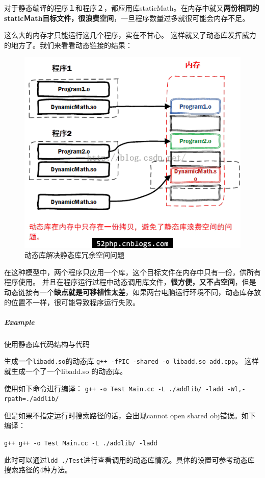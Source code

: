 \documentclass[UTF8,a4paper,12pt]{ctexbook}
\begin{document}
			对于静态编译的程序１和程序２，都应用库staticMath。在内存中就又\textbf{两份相同的staticＭath目标文件，很浪费空间}，一旦程序数量过多就很可能会内存不足。
			
			这么大的内存才只能运行这几个程序，实在不甘心。
			这样就又了动态库发挥威力的地方了。我们来看看动态链接的结果：
			
			\begin{figure}[h]
				\centering
				\includegraphics[scale = 0.7]{dynamicLib.png}
				\caption{动态库解决静态库冗余空间问题}
			\end{figure}

			在这种模型中，两个程序只应用一个库，这个目标文件在内存中只有一份，供所有程序使用。
			并且在程序运行过程中动态调用库文件，\textbf{很方便，又不占空间}，但是动态链接有一个\textbf{缺点就是可移植性太差}，如果两台电脑运行环境不同，动态库存放的位置不一样，很可能导致程序运行失败。
			
			\subparagraph{Example}使用静态库代码结构与代码
			
			生成一个\verb|libadd.so|的动态库
			\verb|g++ -fPIC -shared -o libadd.so add.cpp|。
			这样就生成一个了一个libadd.so 的动态库。
			
			
			使用如下命令进行编译：
			\verb|g++ -o Test Main.cc -L ./addlib/ -ladd -Wl,-rpath=./addlib/|
			
			但是如果不指定运行时搜索路径的话，会出现cannot open shared obj错误。如下编译：
			
			\verb|g++ g++ -o Test Main.cc -L ./addlib/ -ladd|
			
			此时可以通过\verb|ldd ./Test|进行查看调用的动态库情况。具体的设置可参考动态库搜索路径的4种方法。
			
\end{document}
